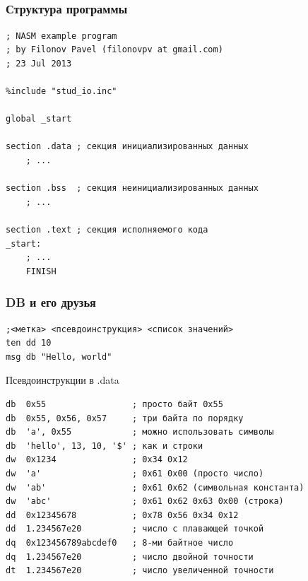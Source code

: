 \documentclass{beamer}
\begin{document}
    \subsection{}
    \begin{frame}[fragile]
        \frametitle{Структура программы}\small
        \begin{verbatim}
; NASM example program
; by Filonov Pavel (filonovpv at gmail.com)
; 23 Jul 2013

%include "stud_io.inc"

global _start

section .data ; секция инициализированных данных
    ; ...

section .bss  ; секция неинициализированных данных 
    ; ...

section .text ; секция исполняемого кода
_start:
    ; ...
    FINISH
        \end{verbatim}
\end{frame}
    \begin{frame}[fragile]
        \frametitle{DB и его друзья}\small
        \begin{verbatim}
;<метка> <псевдоинструкция> <список значений> 
ten dd 10 
msg db "Hello, world"\end{verbatim}
        \begin{block}{Псевдоинструкции в .data}\small
            \begin{verbatim}
db  0x55                 ; просто байт 0x55
db  0x55, 0x56, 0x57     ; три байта по порядку
db  'a', 0x55            ; можно использовать символы
db  'hello', 13, 10, '$' ; как и строки
dw  0x1234               ; 0x34 0x12
dw  'a'                  ; 0x61 0x00 (просто число)
dw  'ab'                 ; 0x61 0x62 (символьная константа)
dw  'abc'                ; 0x61 0x62 0x63 0x00 (строка)
dd  0x12345678           ; 0x78 0x56 0x34 0x12
dd  1.234567e20          ; число с плавающей точкой
dq  0x123456789abcdef0   ; 8-ми байтное число
dq  1.234567e20          ; число двойной точности
dt  1.234567e20          ; число увеличенной точности
            \end{verbatim}
        \end{block}
\end{frame}
\end{document}
